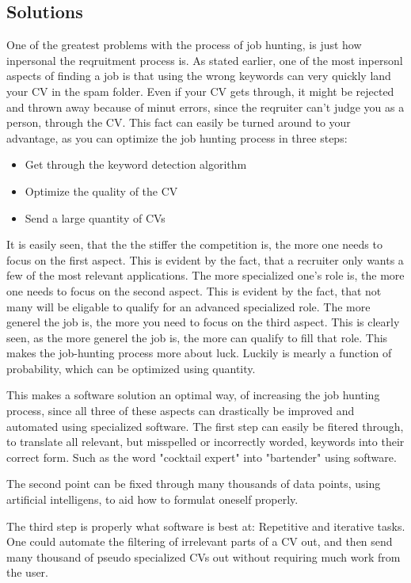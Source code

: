 \subsection{Solutions}
One of the greatest problems with the process of job hunting, is just how inpersonal
the reqruitment process is. As stated earlier, one of the most inpersonl aspects
of finding a job is that using the wrong keywords can very
quickly land your CV in the spam folder.
Even if your CV gets through, it might be rejected and thrown away because of
minut errors, since the reqruiter can't judge you as a person, through the CV.
This fact can easily be turned around to your advantage, as you can optimize the
job hunting process in three steps:
\begin{itemize}
  \item Get through the keyword detection algorithm
  \item Optimize the quality of the CV
  \item Send a large quantity of CVs
\end{itemize}

It is easily seen, that the the stiffer the competition is, the more one 
needs to focus on the first aspect. This is evident by the fact, that a 
recruiter only wants a few of the most relevant applications.
The more specialized one's role is, the more one needs to focus on the second
aspect. This is evident by the fact, that not many will be eligable to qualify
for an advanced specialized role.
The more generel the job is, the more you need to focus on the third
aspect. This is clearly seen, as the more generel the job is, the more can 
qualify to fill that role. This makes the job-hunting process more about luck.
Luckily is mearly a function of probability, which can be optimized using
quantity.

This makes a software solution an optimal way, of increasing the job hunting
process, since all three of these aspects can drastically be improved and automated
using specialized software. 
The first step can easily be fitered through, to translate all relevant, but
misspelled or incorrectly worded, keywords into their correct form. Such
as the word "cocktail expert" into "bartender" using software.

The second point can be fixed through many thousands of data points, using
artificial intelligens, to aid how to formulat oneself properly. 

The third step is properly what software is best at: Repetitive and iterative
tasks.
One could automate the filtering of irrelevant parts of a CV out, and then send
many thousand of pseudo specialized CVs out without requiring much work from the
user.


